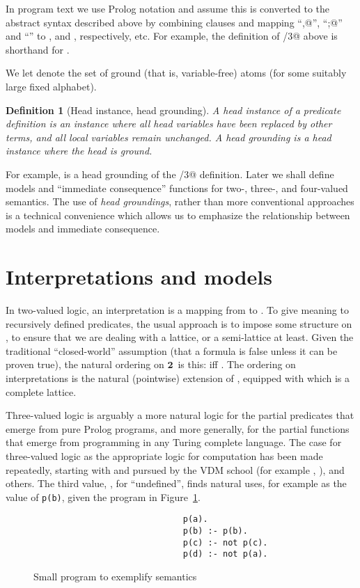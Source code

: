 \documentclass{tlp}
\newtheorem{definition}{Definition}
\newcommand{\Bi}{\ensuremath{\mathbf{2}}}
\begin{document}
In program text we use Prolog notation and assume this is
converted to the abstract syntax described above by combining
clauses and mapping ``\verb@,@'', ``\verb@;@'' and ``\verb@not@'' to
,  and , respectively, etc.  For example, the
definition of \verb@implies/3@ above is shorthand for
.

We let  denote the set of ground (that is, variable-free)
atoms (for some suitably large fixed alphabet).

\begin{definition}[Head instance, head grounding] \rm
\label{def-headinstance}
A \emph{head instance} of a predicate definition 
is an instance where all head variables have been replaced by other
terms, and all local variables remain unchanged.
A \emph{head grounding} is a head instance where the head is ground.
\end{definition}

For example, 
is a head grounding of the \verb@implies/3@ definition.
Later we shall define models and  ``immediate consequence'' 
functions for two-, three-, and four-valued semantics.
The use of \emph{head groundings}, rather than more conventional 
approaches is a technical convenience which allows us to emphasize 
the relationship between models and immediate consequence.

\section{Interpretations and models}
\label{sec-interpretations}

In two-valued logic, an interpretation is a mapping from 
to .
To give meaning to recursively defined predicates, the usual approach is
to impose some structure on , to ensure that we
are dealing with a lattice, or a semi-lattice at least.
Given the traditional ``closed-world'' assumption (that a formula is
false unless it can be proven true), the natural ordering on \Bi\ is this:
 iff .
The ordering on interpretations is the natural (pointwise)
extension of ,
equipped with which  is a complete lattice.

Three-valued logic is arguably a more natural logic for the partial
predicates that emerge from pure Prolog programs, and more
generally, for the partial functions that emerge from programming
in any Turing complete language.
The case for three-valued logic as the appropriate logic for
computation has been made repeatedly, starting
with  and pursued by the VDM school
(for example
, ),
and others.
The third value, , for ``undefined'', finds natural uses,
for example as the value of \verb!p(b)!, given the program in
Figure~\ref{eg-clark}.
\begin{figure}
\begin{verbatim}
                              p(a).
                              p(b) :- p(b).
                              p(c) :- not p(c).
                              p(d) :- not p(a).
\end{verbatim}
\caption{Small program to exemplify semantics}
\label{eg-clark}
\end{figure}
\end{document}
